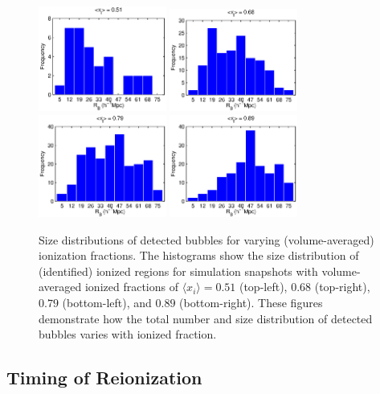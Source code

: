 \begin{figure}[h]
  \centering 
  \includegraphics[width=4.2cm]{f10a.eps}
  \includegraphics[width=4.2cm]{f10b.eps}
  \includegraphics[width=4.2cm]{f10c.eps}
  \includegraphics[width=4.2cm]{f10d.eps}
  \caption{Size distributions of detected bubbles for varying (volume-averaged) ionization fractions. 
    The histograms show the size distribution of (identified)  ionized regions 
for simulation snapshots with
    volume-averaged ionized fractions of $\langle x_i \rangle = 0.51$ (top-left),
    $0.68$ (top-right), $0.79$ (bottom-left), and $0.89$
    (bottom-right). These figures demonstrate how the total number and size
    distribution of detected bubbles varies with ionized fraction.}
  \label{fig:SizeHists}
\end{figure}

\subsection{Timing of Reionization} \label{sec:Timing}

